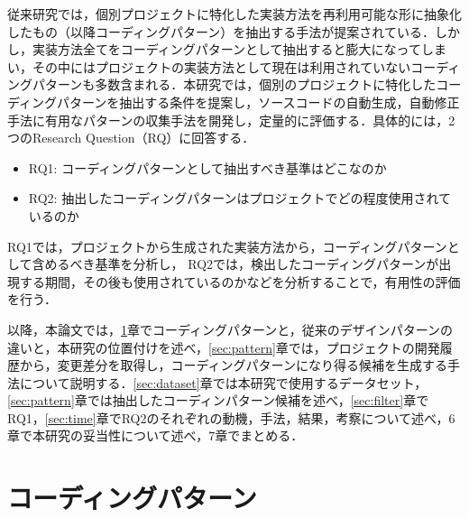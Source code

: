 \documentclass[11pt]{jreport}
\newcommand{\RQone}{コーディングパターンとして抽出すべき基準はどこなのか}
\newcommand{\RQtwo}{抽出したコーディングパターンはプロジェクトでどの程度使用されているのか}
\newcommand{\todo}[1]{\colorbox{yellow}{{\bf TODO}:}{\color{red} {\textbf{[#1]}}}}
\begin{document}
従来研究では，個別プロジェクトに特化した実装方法を再利用可能な形に抽象化したもの（以降コーディングパターン）を抽出する手法が提案されている．しかし，実装方法全てをコーディングパターンとして抽出すると膨大になってしまい，その中にはプロジェクトの実装方法として現在は利用されていないコーディングパターンも多数含まれる．本研究では，個別のプロジェクトに特化したコーディングパターンを抽出する条件を提案し，ソースコードの自動生成，自動修正手法に有用なパターンの収集手法を開発し，定量的に評価する．具体的には，2つのResearch Question（RQ）に回答する．
\begin{itemize}
    \item RQ1: \RQone
    \item RQ2: \RQtwo
\end{itemize}

RQ1では，プロジェクトから生成された実装方法から，コーディングパターンとして含めるべき基準を分析し，
RQ2では，検出したコーディングパターンが出現する期間，その後も使用されているのかなどを分析することで，有用性の評価を行う．

以降，本論文では，\ref{sec:related}章でコーディングパターンと，従来のデザインパターンの違いと，本研究の位置付けを述べ，\ref{sec:pattern}章では，プロジェクトの開発履歴から，変更差分を取得し，コーディングパターンになり得る候補を生成する手法について説明する．\ref{sec:dataset}章では本研究で使用するデータセット，\ref{sec:pattern}章では抽出したコーディンパターン候補を述べ，\ref{sec:filter}章でRQ1，\ref{sec:time}章でRQ2のそれぞれの動機，手法，結果，考察について述べ，6章で本研究の妥当性について述べ，7章でまとめる．

\chapter{コーディングパターン}\label{sec:related}
\end{document}
